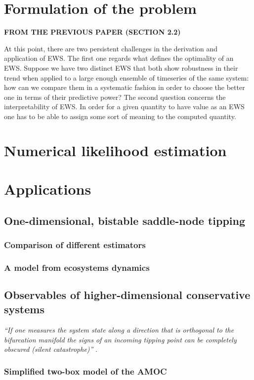 \documentclass[openacc]{rsproca_new}
\begin{document}
\section{Formulation of the problem}\label{sec:setup}
\textbf{FROM THE PREVIOUS PAPER (SECTION 2.2)}

At this point, there are two persistent challenges in the derivation and application of EWS.
The first one regards what defines the optimality of an EWS.
Suppose we have two distinct EWS that both show robustness in their trend when applied to a large enough ensemble of timeseries of the same system: how can we compare them in a systematic fashion in order to choose the better one in terms of their predictive power?
The second question concerns the interpretability of EWS.
In order for a given quantity to have value as an EWS one has to be able to assign some sort of meaning to the computed quantity.

\section{Numerical likelihood estimation}\label{sec:likelihood_estimation}

\section{Applications}\label{sec:applications}
\subsection{One-dimensional, bistable saddle-node tipping}
\subsubsection{Comparison of different estimators}
\subsubsection{A model from ecosystems dynamics}
\subsection{Observables of higher-dimensional conservative systems}
\textit{``If one measures the system state along a direction that is orthogonal to the bifurcation manifold the signs of an incoming tipping point can be completely obscured (silent catastrophe)''} \cite[p. 3]{Dylewsky2024}.
\subsubsection{Simplified two-box model of the AMOC}
\end{document}
